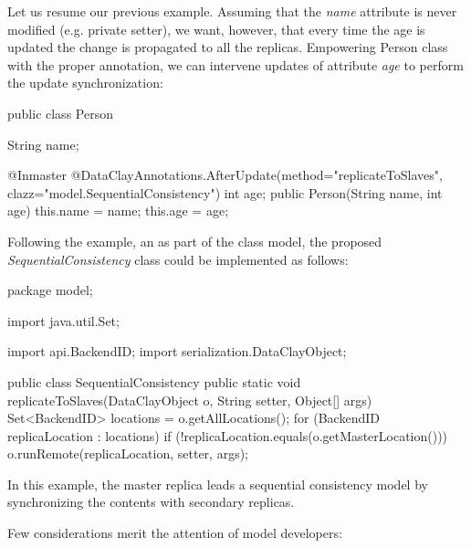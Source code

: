 Let us resume our previous example. Assuming that the \textit{name} attribute is never modified (e.g. private setter), we want, however, that every time the age is updated the change is propagated to all the replicas. Empowering Person class with the proper annotation, we can intervene updates of attribute \textit{age} to perform the update synchronization:

\begin{tBox}
\begin{java}
public class Person {
  String name;

  @Inmaster
  @DataClayAnnotations.AfterUpdate(method="replicateToSlaves",
                                    clazz="model.SequentialConsistency")
  int age;
  public Person(String name, int age) {
    this.name = name;
    this.age = age;
  }
}
\end{java}
\end{tBox}

Following the example, an as part of the class model, the proposed \textit{SequentialConsistency} class could be implemented as follows:

\begin{tBox}
\begin{java}
package model;

import java.util.Set;

import api.BackendID;
import serialization.DataClayObject;

public class SequentialConsistency {
  public static void replicateToSlaves(DataClayObject o, String setter, Object[] args) {
    Set<BackendID> locations = o.getAllLocations();
    for (BackendID replicaLocation : locations) {
      if (!replicaLocation.equals(o.getMasterLocation())) {
         o.runRemote(replicaLocation, setter, args);
      }
    }
  }
}
\end{java}
\end{tBox}

In this example, the master replica leads a sequential consistency model by synchronizing the contents with secondary replicas.

Few considerations merit the attention of model developers:

